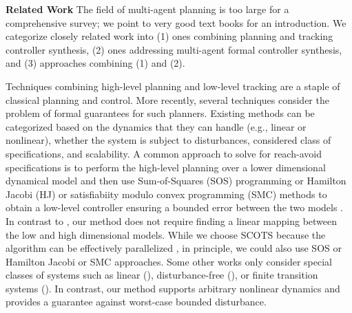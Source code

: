 \smallskip
\noindent\textbf{Related Work}
%
The field of multi-agent planning is too large for a comprehensive survey; we point to very good text books
\cite{LaValle2006,LaValle1998planning,choset2005principles,russel2010AIplanning} for an introduction.
We categorize closely related work into (1) ones combining planning and tracking controller synthesis, 
(2) ones addressing multi-agent formal controller synthesis, and 
(3) approaches combining (1) and (2).

Techniques combining high-level planning and low-level tracking are a staple of classical planning and control. 
More recently, several techniques consider the problem of formal guarantees for such planners.
Existing methods can be categorized based on the dynamics that they can handle (e.g., linear or nonlinear),
whether the system is subject to disturbances, considered class of specifications, and scalability. 
A common approach to solve for reach-avoid specifications is to perform the high-level planning over a lower dimensional dynamical model and then use
Sum-of-Squares (SOS) programming or Hamilton Jacobi (HJ) or satisfiabiity modulo convex programming (SMC) methods to obtain a low-level controller ensuring a bounded error between the 
two models \cite{herbert2017fastrack,DBLP:journals/corr/abs-1911-09773,singh2018robust,sun2019,Nilsson:2018}. In contrast to \cite{herbert2017fastrack,singh2018robust}, our method does not require finding 
a linear mapping between the low and high dimensional models. 
While we choose SCOTS because the algorithm can be effectively parallelized \cite{KhaledZ19pfaces}, in principle, we could
also use SOS or Hamilton Jacobi or SMC approaches. %
Some other works only consider special classes of systems such as linear (\cite{fan2018controller,wongpiromsarn2012receding,Rodionova2020LearningtoFlyLC}), 
disturbance-free (\cite{tedrake2010lqr,fan2020fast,Srinivasan2018}), or finite transition systems (\cite{Yang2017milp}). 
In contrast, our method supports arbitrary 
 nonlinear dynamics and provides a guarantee 
against worst-case bounded disturbance.
	

